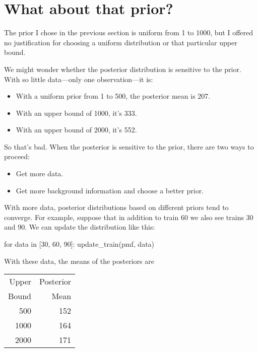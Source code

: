 \documentclass[12pt]{book}
\theoremstyle{exercise}
\begin{document}


\section{What about that prior?}

The prior I chose in the previous section is uniform from 1 to 1000, but I offered no justification for choosing a uniform distribution or that particular upper bound.


We might wonder whether the posterior distribution is sensitive to the prior.
With so little data---only one observation---it is:

\begin{itemize}

\item With a uniform prior from 1 to 500, the posterior mean is 207.

\item With an upper bound of 1000, it's 333.

\item With an upper bound of 2000, it's 552.

\end{itemize}

So that's bad.
When the posterior is sensitive to the prior, there are two ways to proceed:

\begin{itemize}

\item Get more data.

\item Get more background information and choose a better prior.

\end{itemize}

With more data, posterior distributions based on different
priors tend to converge.
For example, suppose that in addition
to train 60 we also see trains 30 and 90.
We can update the distribution like this:

\begin{code}
for data in [30, 60, 90]:
    update_train(pmf, data)
\end{code}

With these data, the means of the posteriors are

\begin{tabular}{r r}
\toprule
Upper & Posterior \\
Bound & Mean \\
\midrule
500 & 152 \\
1000 & 164\\
2000 & 171\\
\bottomrule
\end{tabular}
\end{document}
